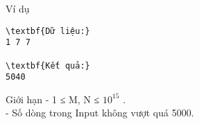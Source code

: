 Ví dụ
\begin{verbatim}
\textbf{Dữ liệu:}
1 7 7

\textbf{Kết quả:}
5040
\end{verbatim}
Giới hạn
- 1 ≤ M, N ≤ $10^{15}$   .   
\\   - Số dòng trong Input không vượt quá 5000.